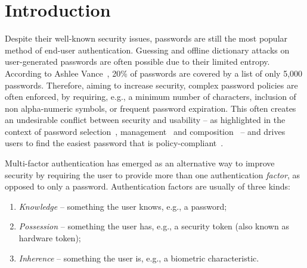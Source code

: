 \documentclass[conference]{IEEEtran}
\begin{document}
\renewcommand{\thefootnote}{\fnsymbol{footnote}}



\section{Introduction}

Despite their well-known security issues, passwords are still the most popular method of end-user authentication. Guessing and offline dictionary attacks on user-generated passwords are often possible due to their limited entropy. According to Ashlee Vance~\cite{hackme}, 20\% of passwords are covered by a list of only 5,000 passwords. Therefore, aiming to increase security, complex password policies are often enforced, by requiring, e.g., a minimum number of characters,  inclusion of non alpha-numeric symbols, or frequent password expiration. This often creates an undesirable conflict between security and usability -- as highlighted in the context of password selection~\cite{egelman2013does}, management~\cite{karole2011comparative,weiss2008passshapes} and composition~\cite{komanduri2011passwords,von2013survival} -- and drives users to find the easiest password that is policy-compliant~\cite{adams1999users}.



Multi-factor authentication has emerged as an alternative way to improve security by requiring the user to provide more than one authentication {\em factor}, as opposed to only a password. Authentication factors are usually of three kinds:
\begin{enumerate}
\item {\em Knowledge} -- something the user knows, e.g., a password;
\item {\em Possession} -- something the user has, e.g., a security token (also known as hardware token);
\item {\em Inherence} -- something the user is, e.g., a biometric characteristic. 
\end{enumerate}

\renewcommand{\thefootnote}{\arabic{footnote}}
\end{document}
